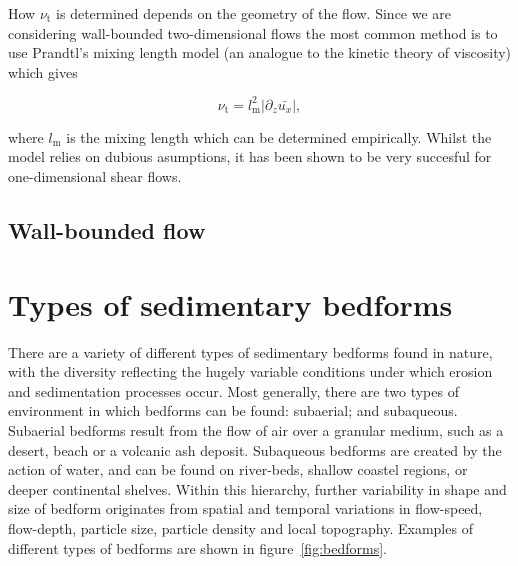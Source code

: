 \documentclass[12pt]{article}
\begin{document}
How $\nu_{\text{t}}$ is determined depends on the geometry of the flow. Since we are considering wall-bounded two-dimensional flows the most common method is to use Prandtl's mixing length model \citep{Prandtl25} (an analogue to the kinetic theory of viscosity) which gives

\begin{equation}
\label{equ:mix_length}
\nu_{\text{t}} = l_{\text{m}}^{2} |\partial_{z} \bar{u_{x}}|,
\end{equation}

where $l_{\text{m}}$ is the mixing length which can be determined empirically. Whilst the model relies on dubious asumptions, it has been shown to be very succesful for one-dimensional shear flows. 

\subsection{Wall-bounded flow}
\label{subsec:wall}


\section{Types of sedimentary bedforms}
\label{sec:sed_bed}

There are a variety of different types of sedimentary bedforms found in nature, with the diversity reflecting the hugely variable conditions under which erosion and sedimentation processes occur. Most generally, there are two types of environment in which bedforms can be found: subaerial; and subaqueous. Subaerial bedforms result from the flow of air over a granular medium, such as a desert, beach or a volcanic ash deposit. Subaqueous bedforms are created by the action of water, and can be found on river-beds, shallow coastel regions, or deeper continental shelves. Within this hierarchy, further variability in shape and size of bedform originates from spatial and temporal variations in flow-speed, flow-depth, particle size, particle density and local topography. Examples of different types of bedforms are shown in figure~\ref{fig:bedforms}.
\end{document}
